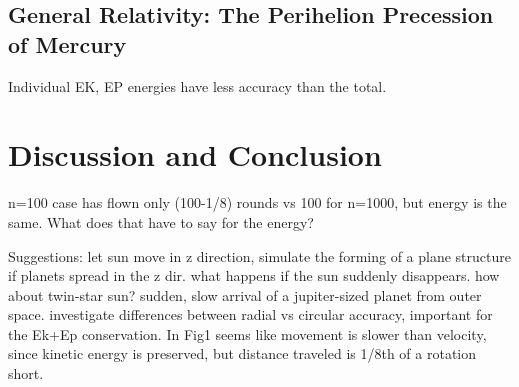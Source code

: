 \documentclass[]{article}
\begin{document}
\subsection{General Relativity: The Perihelion Precession of Mercury}


Individual EK, EP energies have less accuracy than the total.

\section{Discussion and Conclusion} \label{conclusion}

n=100 case has flown only (100-1/8) rounds vs 100 for n=1000, but energy is the same. What does that have to say for the energy?

Suggestions: let sun move in z direction, simulate the forming of a plane structure if planets spread in the z dir. what happens if the sun suddenly disappears. how about twin-star sun? sudden, slow arrival of a jupiter-sized planet from outer space. investigate differences between radial vs circular accuracy, important for the Ek+Ep conservation. In Fig1 seems like movement is slower than velocity, since kinetic energy is preserved, but distance traveled is 1/8th of a rotation short.

\clearpage


\end{document}
